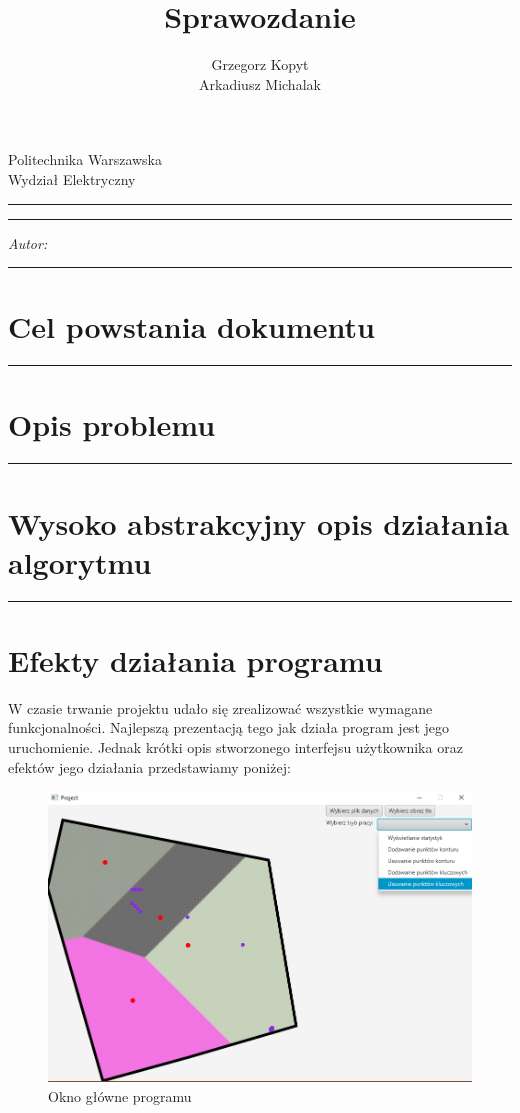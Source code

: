 \documentclass[a4paper,11pt]{article}
\author{Grzegorz Kopyt\\Arkadiusz Michalak}
\title{Sprawozdanie}
\makeatletter
\newcommand{\linia}{\rule{\linewidth}{0.4mm}}
\renewcommand{\maketitle}{\begin{titlepage}
    \vspace*{2cm}
    \begin{center}\LARGE
    Politechnika Warszawska\\
    Wydział Elektryczny\\
    \end{center}
    \vspace{5cm}
    \noindent\linia
    \begin{center}
      \LARGE \textsc{\@title}
         \end{center}
     \linia
    \vspace{0.5cm}
    \begin{flushright}
    \begin{minipage}{5cm}
    \textit{Autor:}\\
    \normalsize \textsc{\@author} \par
    \end{minipage}
    \vspace{5cm}
     \end{flushright}
    \vspace*{\stretch{6}}
    \begin{center}
    \@date
    \end{center}
  \end{titlepage}
}
\makeatother
\begin{document}
\maketitle

\tableofcontents
\vspace{1cm}
\noindent\linia
\section{Cel powstania dokumentu}

\noindent\linia
\section{Opis problemu}

\noindent\linia
\section{Wysoko abstrakcyjny opis działania algorytmu}

\noindent\linia
\section{Efekty działania programu}
W czasie trwanie projektu udało się zrealizować wszystkie wymagane funkcjonalności. Najlepszą prezentacją tego jak działa program jest jego uruchomienie. Jednak krótki opis stworzonego interfejsu użytkownika oraz efektów jego działania przedstawiamy poniżej:
\begin{figure}
    \centering
    \caption{Okno główne programu}
    \includegraphics[scale=0.77]{GUI.png}
\end{figure}
\end{document}
